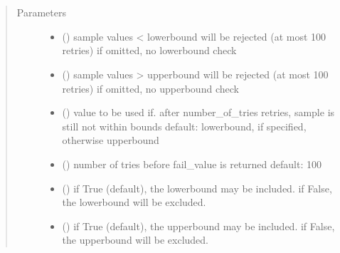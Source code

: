 \documentclass[letterpaper,10pt,english]{sphinxmanual}
\begin{document}
\begin{fulllineitems}
\label{\detokenize{Reference:salabim._Distribution}}~

\begin{fulllineitems}
\label{\detokenize{Reference:salabim._Distribution.bounded_sample}}~\begin{quote}\begin{description}
\item[{Parameters}] \leavevmode\begin{itemize}
\item {} 
 () \textendash{} sample values \textless{} lowerbound will be rejected (at most 100 retries) 
if omitted, no lowerbound check

\item {} 
 () \textendash{} sample values \textgreater{} upperbound will be rejected (at most 100 retries) 
if omitted, no upperbound check

\item {} 
 () \textendash{} value to be used if. after number\_of\_tries retries, sample is still not within bounds 
default: lowerbound, if specified, otherwise upperbound

\item {} 
 () \textendash{} number of tries before fail\_value is returned 
default: 100

\item {} 
 () \textendash{} if True (default), the lowerbound may be included.
if False, the lowerbound will be excluded.

\item {} 
 () \textendash{} if True (default), the upperbound may be included.
if False, the upperbound will be excluded.


\end{itemize}
\end{description}
\end{quote}
\end{fulllineitems}
\end{fulllineitems}
\end{document}
